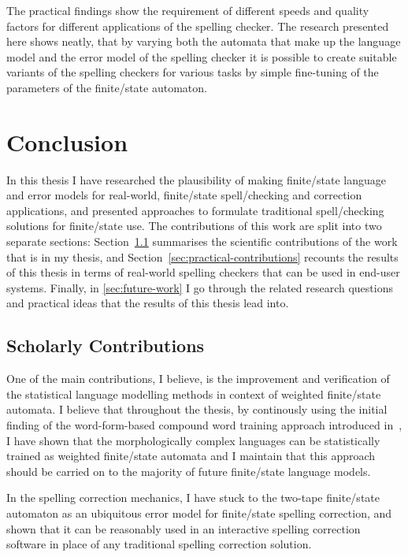 \documentclass[officiallayout]{unihelcompling}
\begin{document}
The practical findings show the requirement of different speeds and quality
factors for different applications of the spelling checker. The research
presented here shows neatly, that by varying both the automata that make up the
language model and the error model of the spelling checker it is possible to
create suitable variants of the spelling checkers for various tasks by simple
fine-tuning of the parameters of the finite\-/state automaton.

\chapter{Conclusion}
\label{chap:conclusion}

In this thesis I have researched the plausibility of making finite\-/state
language and error models for real-world, finite\-/state spell\-/checking and
correction applications, and presented approaches to formulate traditional
spell\-/checking solutions for finite\-/state use. The contributions of this
work are split into two separate sections:
Section~\ref{sec:scholarly-contributions} summarises the scientific
contributions of the work that is in my thesis, and
Section~\ref{sec:practical-contributions} recounts the results of this thesis
in terms of real-world spelling checkers that can be used in end-user systems.
Finally, in \ref{sec:future-work} I go through the related research questions
and practical ideas that the results of this thesis lead into.

\section{Scholarly Contributions}
\label{sec:scholarly-contributions}

One of the main contributions, I believe, is the improvement and verification
of the statistical language modelling methods in context of weighted
finite\-/state automata. I believe that throughout the thesis, by continously
using the initial finding of the word-form-based compound word training
approach introduced in~, I have shown that the
morphologically complex languages can be statistically trained as weighted
finite\-/state automata and I maintain that this approach should be carried on
to the majority of future finite\-/state language models.

In the spelling correction mechanics, I have stuck to the two-tape
finite\-/state automaton as an ubiquitous error model for finite\-/state
spelling correction, and shown that it can be reasonably used in an interactive
spelling correction software in place of any traditional spelling correction
solution.
\end{document}
